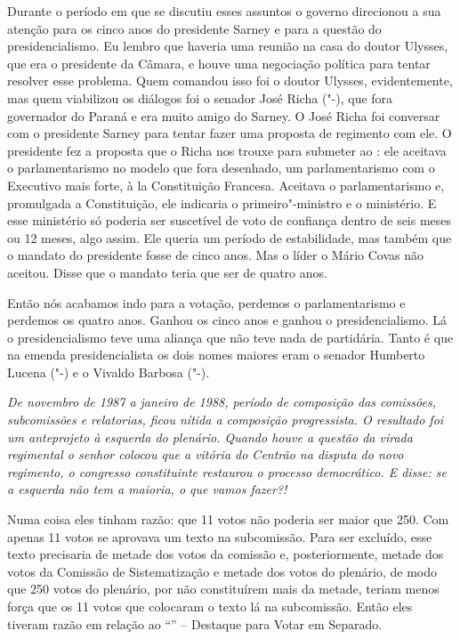Durante o período em que se discutiu esses assuntos o governo direcionou
a sua atenção para os cinco anos do presidente Sarney e para a questão
do presidencialismo. Eu lembro que haveria uma reunião na casa do doutor
Ulysses, que era o presidente da Câmara, e houve uma negociação política
para tentar resolver esse problema. Quem comandou isso foi o doutor
Ulysses, evidentemente, mas quem viabilizou os diálogos foi o senador
José Richa ("-), que fora governador do Paraná e era muito amigo do
Sarney. O José Richa foi conversar com o presidente Sarney para tentar
fazer uma proposta de regimento com ele. O presidente fez a proposta que
o Richa nos trouxe para submeter ao : ele aceitava o parlamentarismo
no modelo que fora desenhado, um parlamentarismo com o Executivo mais
forte, à la Constituição Francesa. Aceitava o parlamentarismo e,
promulgada a Constituição, ele indicaria o primeiro"-ministro e o
ministério. E esse ministério só poderia ser suscetível de voto de
confiança dentro de seis meses ou 12 meses, algo assim. Ele queria um
período de estabilidade, mas também que o mandato do presidente fosse de
cinco anos. Mas o líder o Mário Covas não aceitou. Disse que o mandato
teria que ser de quatro anos.

Então nós acabamos indo para a votação, perdemos o parlamentarismo e
perdemos os quatro anos. Ganhou os cinco anos e ganhou o
presidencialismo. Lá o presidencialismo teve uma aliança que não teve
nada de partidária. Tanto é que na emenda presidencialista os dois nomes
maiores eram o senador Humberto Lucena ("-) e o Vivaldo Barbosa
("-).

\medskip

\noindent\emph{De novembro de 1987 a janeiro de 1988, período de composição das
comissões, subcomissões e relatorias, ficou nítida a composição
progressista. O resultado foi um anteprojeto à esquerda do plenário.
Quando houve a questão da virada regimental o senhor colocou que a
vitória do Centrão na disputa do novo regimento, o congresso
constituinte restaurou o processo democrático. E disse: se a esquerda
não tem a maioria, o que vamos fazer?!}

Numa coisa eles tinham razão: que 11 votos não poderia
ser maior que 250. Com apenas 11 votos se aprovava um texto na
subcomissão. Para ser excluído, esse texto precisaria de metade dos
votos da comissão e, posteriormente, metade dos votos da Comissão de
Sistematização e metade dos votos do plenário, de modo que 250 votos do
plenário, por não constituírem mais da metade, teriam menos força que os
11 votos que colocaram o texto lá na subcomissão. Então eles tiveram
razão em relação ao ``'' -- Destaque para Votar em Separado.

